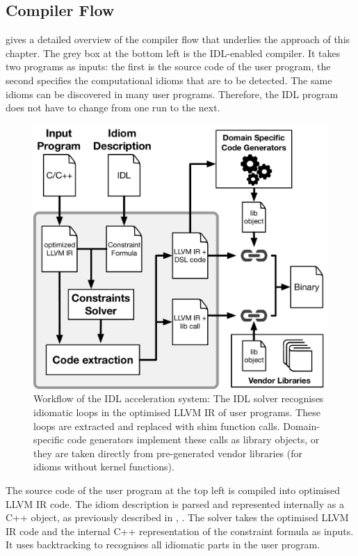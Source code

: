 \subsection{Compiler Flow}

     gives a detailed overview of the compiler flow that
    underlies the approach of this chapter.
    The grey box at the bottom left is the IDL-enabled compiler.
    It takes two programs as inputs: the first is the source code of
    the user program, the second specifies the computational idioms that are to
    be detected.
    The same idioms can be discovered in many user programs.
    Therefore, the IDL program does not have to change from one run to the next.

\begin{figure}[p]
    \centering
    \includegraphics[width=\linewidth]{figures/compiler_flow.pdf}
    \caption{Workflow of the IDL acceleration system:
             The IDL solver recognises idiomatic loops in the optimised LLVM IR
             of user programs.
             These loops are extracted and replaced with shim function calls.
             Domain-specific code generators implement these calls as library
             objects, or they are taken directly from pre-generated vendor
             libraries (for idioms without kernel functions).}
    \label{fig:methodology}
\end{figure}

    The source code of the user program at the top left is compiled into
    optimised LLVM IR code.
    The idiom description is parsed and represented internally as a C++
    object, as previously described in ,
    .
    The solver takes the optimised LLVM IR code and the internal C++
    representation of the constraint formula as inputs.
    It uses backtracking to recognises all idiomatic parts in the user program.

